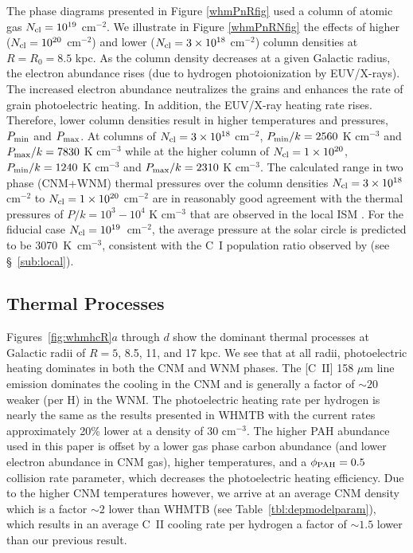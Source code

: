 \documentclass[12pt,preprint,flushrt]{aastex}
\newcommand{\ee}{$^{-2}$}
\newcommand{\eee}{$^{-3}$}
\begin{document}
The phase diagrams presented in Figure \ref{whmPnRfig}
used a column of atomic gas $N_{\rm cl} = 10^{19}$
cm$^{-2}$.
We illustrate in Figure \ref{whmPnRNfig} the effects of higher
($N_{\rm cl} = 10^{20}$ cm$^{-2}$) and lower
($N_{\rm cl} = 3\times 10^{18}$ cm$^{-2}$)
column densities at $R=R_0=8.5$ kpc. As the column density decreases
at a given Galactic radius,
the electron abundance rises (due to hydrogen photoionization
by EUV/X-rays). The
increased electron abundance neutralizes the grains and enhances
the rate of grain photoelectric heating. In addition, the EUV/X-ray 
heating rate rises. Therefore, lower column densities
result in higher temperatures and pressures, $P_{\rm min}$ and
$P_{\rm max}$. At columns of $N_{\rm cl} = 3\times 10^{18}$ cm$^{-2}$,
$P_{\rm min}/k =2560 $ K cm$^{-3}$ and $P_{\rm max}/k=7830$ K cm$^{-3}$
while at the higher column of
$N_{\rm cl} = 1\times 10^{20}$, $P_{\rm min}/k = 1240$ K cm$^{-3}$ and
$P_{\rm max}/k = 2310$ K cm$^{-3}$.  The calculated range in two
phase (CNM+WNM) thermal pressures over the
column densities $N_{\rm cl} = 3\times 10^{18}$ cm$^{-2}$ to
$N_{\rm cl} = 1\times 10^{20}$ cm$^{-2}$
are in reasonably good agreement with the thermal pressures
of $P/k = 10^3 - 10^4$ K cm$^{-3}$ that are observed in the local ISM
\citep{jen83,jen01}.  For the fiducial case $N_{\rm cl}=10^{19}$~cm\ee, the
average pressure at the solar circle is predicted to be 3070~K~cm\eee,
consistent with the C~I population ratio observed by
\cite{jen01} (see \S~\ref{sub:local}).

\subsection{Thermal Processes}
\label{sub:thermal}

Figures~\ref{fig:whmhcR}$a$ through $d$ show the dominant
thermal  processes at Galactic radii of $R=5$, 8.5, 11, and 17 kpc.
We see that at all
radii, photoelectric heating dominates in both the CNM and WNM phases.
The [C~II] 158 $\mu$m line emission dominates the cooling in the CNM and is
generally a factor of $\sim 20$ weaker (per H) in the WNM.
The photoelectric heating rate per hydrogen
is nearly the same as the results presented in WHMTB with
the current rates approximately 20\% lower
at a density of 30 cm$^{-3}$. 
The higher PAH abundance used in this paper is offset by a lower
gas phase carbon abundance (and lower
electron abundance in CNM gas), higher temperatures, 
and a $\phi_{\rm PAH} = 0.5$ collision rate parameter,
which decreases the photoelectric heating efficiency. 
Due to the higher CNM temperatures  however, we arrive at an
average CNM density which is a factor  $\sim 2$ lower than
WHMTB (see Table~\ref{tbl:depmodelparam}), which results in an
average 
C~II cooling rate per hydrogen a factor of $\sim 1.5$ lower than our
previous result. 
\end{document}
